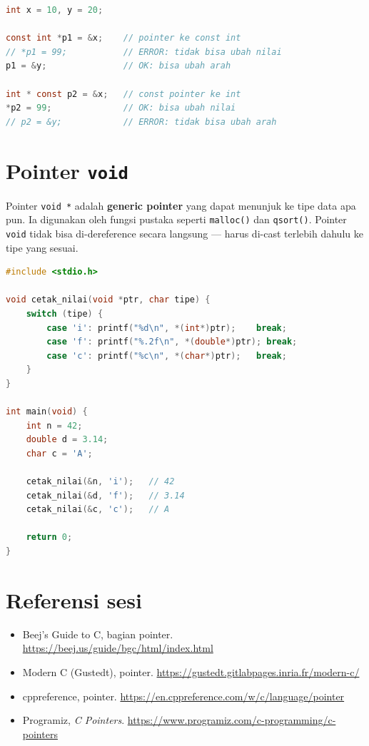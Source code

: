 \documentclass[../main.tex]{subfiles}
\begin{document}
\begin{lstlisting}[language=C,caption=Variasi pointer const]
int x = 10, y = 20;

const int *p1 = &x;    // pointer ke const int
// *p1 = 99;           // ERROR: tidak bisa ubah nilai
p1 = &y;               // OK: bisa ubah arah

int * const p2 = &x;   // const pointer ke int
*p2 = 99;              // OK: bisa ubah nilai
// p2 = &y;            // ERROR: tidak bisa ubah arah
\end{lstlisting}

\section{Pointer \texttt{void}}

Pointer \texttt{void *} adalah \textbf{generic pointer} yang dapat menunjuk ke tipe data apa pun. Ia digunakan oleh fungsi pustaka seperti \texttt{malloc()} dan \texttt{qsort()}. Pointer \texttt{void} tidak bisa di-dereference secara langsung --- harus di-cast terlebih dahulu ke tipe yang sesuai.

\begin{lstlisting}[language=C,caption=Pointer void]
#include <stdio.h>

void cetak_nilai(void *ptr, char tipe) {
    switch (tipe) {
        case 'i': printf("%d\n", *(int*)ptr);    break;
        case 'f': printf("%.2f\n", *(double*)ptr); break;
        case 'c': printf("%c\n", *(char*)ptr);   break;
    }
}

int main(void) {
    int n = 42;
    double d = 3.14;
    char c = 'A';
    
    cetak_nilai(&n, 'i');   // 42
    cetak_nilai(&d, 'f');   // 3.14
    cetak_nilai(&c, 'c');   // A
    
    return 0;
}
\end{lstlisting}

\section{Referensi sesi}
\begin{itemize}[leftmargin=*]
  \item Beej's Guide to C, bagian pointer. \url{https://beej.us/guide/bgc/html/index.html}
  \item Modern C (Gustedt), pointer. \url{https://gustedt.gitlabpages.inria.fr/modern-c/}
  \item cppreference, pointer. \url{https://en.cppreference.com/w/c/language/pointer}
  \item Programiz, \textit{C Pointers}. \url{https://www.programiz.com/c-programming/c-pointers}
\end{itemize}
\end{document}
